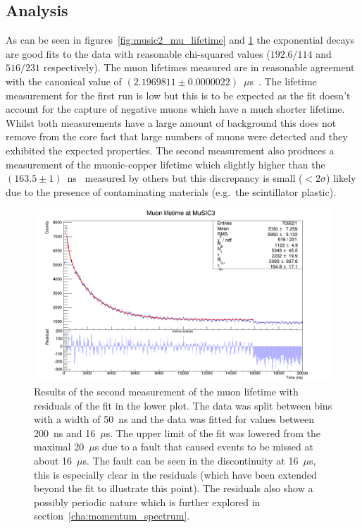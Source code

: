 \subsection{Analysis} %
\label{sec:analysis}
As can be seen in figures~\ref{fig:music2_mu_lifetime} and \ref{fig:music3_muon_lifetime} the exponential decays are good fits to the data with reasonable chi-squared values (\(192.6/114\) and \( 516/231 \) respectively). The muon lifetimes measured are in reasonable agreement with the canonical value of \((2.1969811\pm0.0000022)\)~\(\mu\)s~\cite{pdg}. The lifetime measurement for the first run is low but this is to be expected as the fit doesn't account for the capture of negative muons which have a much shorter lifetime. Whilst both measurements have a large amount of background this does not remove from the core fact that large numbers of muons were detected and they exhibited the expected properties. The second measurement also produces a measurement of the muonic-copper lifetime which slightly higher than the \((163.5\pm1)\)~ns~\cite{suzuki_mu_capture_rates} measured by others but this discrepancy is small (\(<2\sigma\)) likely due to the presence of contaminating materials (e.g.\ the scintillator plastic).

\begin{figure}[hptb]
  \centering
  \includegraphics[width=.9\textwidth]{images/lifetime/music3_muon_lifetime.png}
  \caption{Results of the second measurement of the muon lifetime with residuals of the fit in the lower plot. The data was split between bins with a width of 50~ns and the data was fitted for values between 200~ns and 16~\(\mu\)s. The upper limit of the fit was lowered from the maximal 20~\(\mu\)s due to a fault that caused events to be missed at about 16~\(\mu\)s. The fault can be seen in the discontinuity at 16~\(\mu\)s, this is especially clear in the residuals (which have been extended beyond the fit to illustrate this point). The residuals also show a possibly periodic nature which is further explored in section~\ref{cha:momentum_spectrum}.}
  \label{fig:music3_muon_lifetime}
\end{figure}

